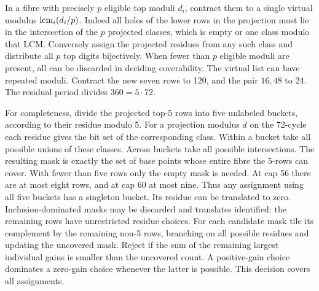 \documentclass[10pt]{article}
\newcommand{\lcm}{\mathop{\rm lcm}}
\begin{document}
In a fibre with precisely $p$ eligible top moduli $d_i$, contract them to a single virtual modulus $\lcm_i(d_i/p)$. Indeed all holes of the lower rows in the projection must lie in the intersection of the $p$ projected classes, which is empty or one class modulo that LCM. Conversely assign the projected residues from any such class and distribute all $p$ top digits bijectively. When fewer than $p$ eligible moduli are present, all can be discarded in deciding coverability. The virtual list can have repeated moduli. Contract the new seven rows to 120, and the pair $16,48$ to 24. The residual period divides $360=5\cdot72$.

For completeness, divide the projected top-5 rows into five unlabeled buckets, according to their residue modulo 5. For a projection modulus $d$ on the 72-cycle each residue gives the bit set of the corresponding class. Within a bucket take all possible unions of these classes. Across buckets take all possible intersections. The resulting mask is exactly the set of base points whose entire fibre the 5-rows can cover. With fewer than five rows only the empty mask is needed. At cap 56 there are at most eight rows, and at cap 60 at most nine. Thus any assignment using all five buckets has a singleton bucket. Its residue can be translated to zero. Inclusion-dominated masks may be discarded and translates identified: the remaining rows have unrestricted residue choices. For each candidate mask tile its complement by the remaining non-5 rows, branching on all possible residues and updating the uncovered mask. Reject if the sum of the remaining largest individual gains is smaller than the uncovered count. A positive-gain choice dominates a zero-gain choice whenever the latter is possible. This decision covers all assignments.
\end{document}

